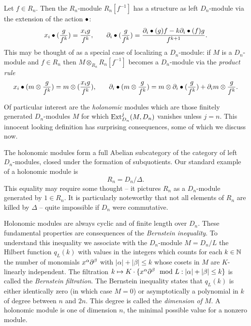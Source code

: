 Let $f\in R_n$. Then the $R_n$-module $R_n[f^{-1}]$ has a
structure as left $D_n$-module via the extension of the action
$\bullet$: 
\begin{eqnarray*}
x_i\bullet (\frac{g}{f^k})=\frac{x_ig}{f^k},&\quad&
\partial_i\bullet (\frac{g}{f^k})=\frac{\partial_i\bullet(g)f-
   k\partial_i\bullet(f)g}{f^{k+1}}.
\end{eqnarray*} 
This may be thought of as a special case of localizing a $D_n$-module: if
$M$ is a $D_n$-module and $f\in R_n$ then $M\otimes_{R_n} R_n[f^{-1}]$ 
becomes a
$D_n$-module via the {\em product rule}
\begin{eqnarray*}
x_i\bullet (m\otimes \frac{g}{f^k})=m\otimes (\frac{x_ig}{f^k}),
&\quad&
\partial_i\bullet (m\otimes \frac{g}{f^k})=
 m\otimes \partial_i\bullet(\frac{g}{f^k})+\partial_i m\otimes \frac{g}{f^k}.
\end{eqnarray*}

Of particular interest are the {\em
holonomic} modules
 which are those finitely generated $D_n$-modules $M$
for which $\operatorname{Ext}^j_{D_n}(M,D_n)$ vanishes 
unless $j=n$. 
This innocent looking definition has surprising consequences,
some of which we discuss now. 

The holonomic modules form a full Abelian subcategory of
the category of left $D_n$-modules, closed under the formation of
subquotients. 
Our standard example of a holonomic module is 
\[
R_n=D_n/\Delta.
\] 
This equality may require some thought -- it pictures $R_n$ as a
$D_n$-module generated by $1\in R_n$. It is particularly noteworthy
that not all elements of $R_n$ are killed by $\Delta$ -- quite
impossible if $D_n$ were commutative. 

Holonomic modules are
always cyclic and of finite length over $D_n$. These fundamental
properties are consequences of the {\em Bernstein
inequality}. To
understand this inequality we associate with the $D_n$-module
$M=D_n/L$ the Hilbert function $q_L(k)$ with values in the integers which
counts for each $k\in{\mathbb N}$ the number of monomials $x^\alpha\partial^\beta$ with
$|\alpha|+|\beta|\le k$ whose cosets in $M$ are $K$-linearly
independent. The filtration $k\mapsto K\cdot \{x^\alpha\partial^\beta\mod L:
|\alpha|+|\beta|\le k\}$ is called the  
{\em Bernstein filtration}. The Bernstein inequality states that 
$q_L(k)$ is either identically 
zero (in which case $M=0$) or asymptotically a
polynomial in $k$ of degree between $n$ and $2n$.
This degree is called the {\em dimension of $M$}.
A holonomic module is one of dimension $n$, the minimal possible value
for a nonzero module.

